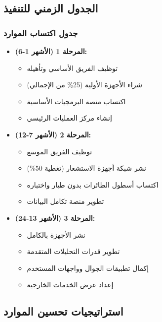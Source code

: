 \subsection{الجدول الزمني للتنفيذ}

\subsubsection{جدول اكتساب الموارد}
\begin{itemize}
    \item \textbf{المرحلة 1 (الأشهر 1-6):}
    \begin{itemize}
        \item توظيف الفريق الأساسي وتأهيله
        \item شراء الأجهزة الأولية (25\% من الإجمالي)
        \item اكتساب منصة البرمجيات الأساسية
        \item إنشاء مركز العمليات الرئيسي
    \end{itemize}
    
    \item \textbf{المرحلة 2 (الأشهر 7-12):}
    \begin{itemize}
        \item توظيف الفريق الموسع
        \item نشر شبكة أجهزة الاستشعار (تغطية 50\%)
        \item اكتساب أسطول الطائرات بدون طيار واختباره
        \item تطوير منصة تكامل البيانات
    \end{itemize}
    
    \item \textbf{المرحلة 3 (الأشهر 13-24):}
    \begin{itemize}
        \item نشر الأجهزة بالكامل
        \item تطوير قدرات التحليلات المتقدمة
        \item إكمال تطبيقات الجوال وواجهات المستخدم
        \item إعداد عرض الخدمات الخارجية
    \end{itemize}
\end{itemize}

\subsection{استراتيجيات تحسين الموارد}

